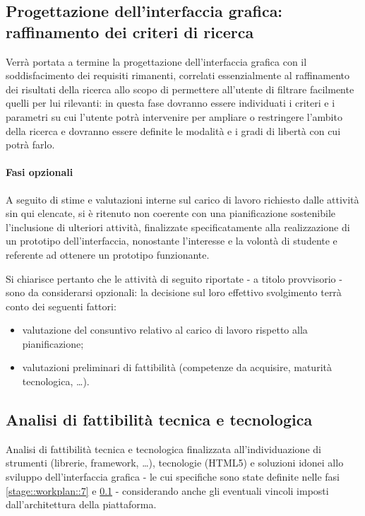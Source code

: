 \documentclass[10pt,a4paper,hidelinks]{scrartcl} %
\begin{document}
	\subsection{Progettazione dell'interfaccia grafica: raffinamento dei criteri di ricerca}
	\label{stage::workplan::8}
	Verrà portata a termine la progettazione dell'interfaccia grafica con il soddisfacimento dei requisiti rimanenti, correlati essenzialmente al raffinamento dei risultati della ricerca allo scopo di permettere all'utente di filtrare facilmente quelli per lui rilevanti: in questa fase dovranno essere individuati i criteri e i parametri su cui l'utente potrà intervenire per ampliare o restringere l'ambito della ricerca e dovranno essere definite le modalità e i gradi di libertà con cui potrà farlo.

	\newpage
	\paragraph{Fasi opzionali}
	A seguito di stime e valutazioni interne sul carico di lavoro richiesto dalle attività sin qui elencate, si è ritenuto non coerente con una pianificazione sostenibile l'inclusione di ulteriori attività, finalizzate specificatamente alla realizzazione di un prototipo dell'interfaccia, nonostante l'interesse e la volontà di studente e referente ad ottenere un prototipo funzionante.

	Si chiarisce pertanto che le attività di seguito riportate - a titolo provvisorio - sono da considerarsi opzionali: la decisione sul loro effettivo svolgimento terrà conto dei seguenti fattori:
	\begin{itemize}
	\item valutazione del consuntivo relativo al carico di lavoro rispetto alla pianificazione;
	\item valutazioni preliminari di fattibilità (competenze da acquisire, maturità tecnologica, \ldots).
	\end{itemize}

	\subsection{Analisi di fattibilità tecnica e tecnologica}
	\label{stage::workplan::9}
	Analisi di fattibilità tecnica e tecnologica finalizzata all'individuazione di strumenti (librerie, framework, \ldots), tecnologie (HTML5) e soluzioni idonei allo sviluppo dell'interfaccia grafica - le cui specifiche sono state definite nelle fasi \ref{stage::workplan::7} e \ref{stage::workplan::8} - considerando anche gli eventuali vincoli imposti dall'architettura della piattaforma.
\end{document}
